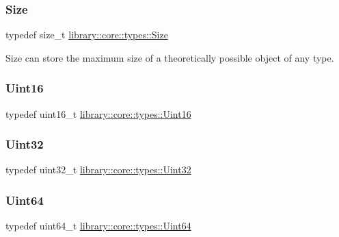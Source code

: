 \subsubsection{\texorpdfstring{Size}{Size}}
{\footnotesize\ttfamily typedef size\+\_\+t \hyperlink{namespacelibrary_1_1core_1_1types_a701626ea1027888ebbb8cfd0ff7adab0}{library\+::core\+::types\+::\+Size}}



Size can store the maximum size of a theoretically possible object of any type. 

\mbox{\label{namespacelibrary_1_1core_1_1types_a058aff3dd2661e18ff83255059561123}} 
\subsubsection{\texorpdfstring{Uint16}{Uint16}}
{\footnotesize\ttfamily typedef uint16\+\_\+t \hyperlink{namespacelibrary_1_1core_1_1types_a058aff3dd2661e18ff83255059561123}{library\+::core\+::types\+::\+Uint16}}

\mbox{\label{namespacelibrary_1_1core_1_1types_a17d56f5d789f5d86d10828c112c77be2}} 
\subsubsection{\texorpdfstring{Uint32}{Uint32}}
{\footnotesize\ttfamily typedef uint32\+\_\+t \hyperlink{namespacelibrary_1_1core_1_1types_a17d56f5d789f5d86d10828c112c77be2}{library\+::core\+::types\+::\+Uint32}}

\mbox{\label{namespacelibrary_1_1core_1_1types_a52eb5d32552dff72468cc9acee3dd70e}} 
\subsubsection{\texorpdfstring{Uint64}{Uint64}}
{\footnotesize\ttfamily typedef uint64\+\_\+t \hyperlink{namespacelibrary_1_1core_1_1types_a52eb5d32552dff72468cc9acee3dd70e}{library\+::core\+::types\+::\+Uint64}}

